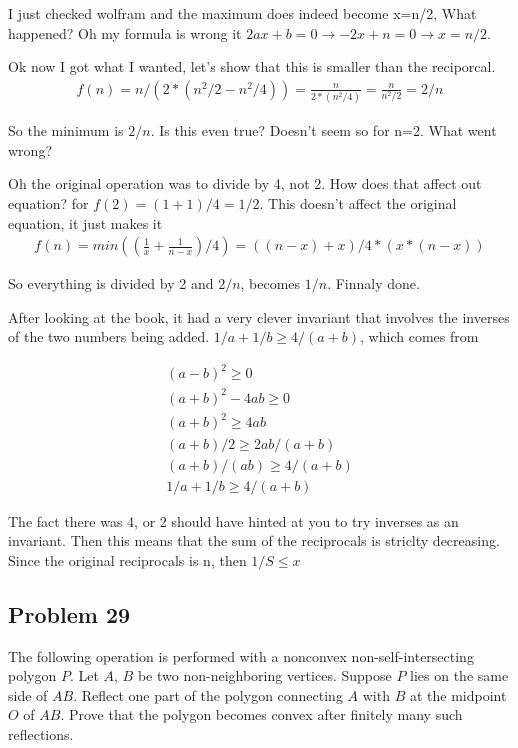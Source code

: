\documentclass[12pt,tikz,border=10pt]{article}
\theoremstyle{definition}
\theoremstyle{remark}
\begin{document}
I just checked wolfram and the maximum does indeed become x=n/2, What happened?
Oh my formula is wrong it $2ax+b=0 \rightarrow -2x+n=0 \rightarrow x=n/2$.

Ok now I got what I wanted, let's show that this is smaller than the reciporcal.
\begin{align*}
    f(n)=n/(2*(n^2/2-n^2/4))=\frac{n}{2*(n^2/4)}=\frac{n}{n^2/2}=2/n
\end{align*}

So the minimum is $2/n$. Is this even true? Doesn't seem so for n=2. What went wrong?

Oh the original operation was to divide by 4, not 2.
How does that affect out equation? for $f(2)=(1+1)/4=1/2$. 
This doesn't affect the original equation, it just makes it 
\begin{align*}
    f(n)=min((\frac{1}{x}+\frac{1}{n-x})/4)=((n-x)+x)/4*(x*(n-x))
\end{align*}

So everything is divided by 2 and $2/n$, becomes $1/n$.
Finnaly done.

After looking at the book, it had a very clever invariant that involves the inverses of 
the two numbers being added. $1/a+1/b \geq 4/(a+b)$, which comes from

\begin{align*}
    (a-b)^2 \geq 0\\
    (a+b)^2 - 4ab \geq 0\\
    (a+b)^2 \geq 4ab\\
    (a+b)/2 \geq 2ab/(a+b)\\
    (a+b)/(ab) \geq 4/(a+b)\\
    1/a + 1/b \geq 4/(a+b)
\end{align*}

The fact there was 4, or 2 should have hinted at you to try inverses as an invariant.
Then this means that the sum of the reciprocals is striclty decreasing. Since the original 
reciprocals is n, then $1/S \leq x$

\subsection{Problem 29}
The following operation is performed with a nonconvex non-self-intersecting polygon $P$. Let $A$, $B$ be two non-neighboring vertices. Suppose $P$ lies on the same side of $AB$. Reflect one part of the polygon connecting $A$ with $B$ at the midpoint $O$ of $AB$. Prove that the polygon becomes convex after finitely many such reflections.
\end{document}
